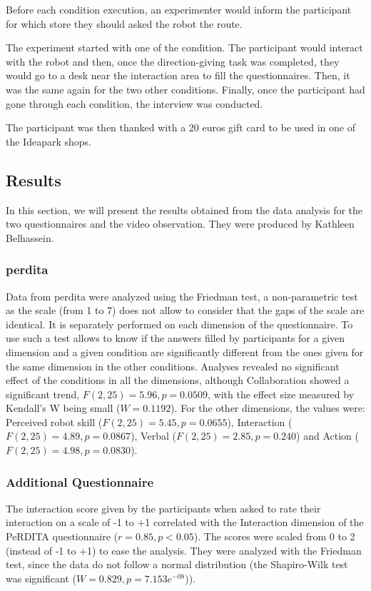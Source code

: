 \documentclass[a4paper,11pt,twoside]{StyleThese}
\begin{document}
Before each condition execution, an experimenter would inform the participant for which store they should asked the robot the route. 

The experiment started with one of the condition. The participant would interact with the robot and then, once the direction-giving task was completed, they would go to a desk near the interaction area to fill the questionnaires. Then, it was the same again for the two other conditions. Finally, once the participant had gone through each condition, the interview was conducted.

The participant was then thanked with a 20 euros gift card to be used in one of the Ideapark shops.

\subsection{Results}\label{chap8:subsec:us_results}

In this section, we will present the results obtained from the data analysis for the two questionnaires and the video observation. They were produced by Kathleen Belhassein.

\subsubsection{\acrshort{perdita}}

Data from \acrshort{perdita} were analyzed using the Friedman test, a non-parametric test as the scale (from 1 to 7) does not allow to consider that the gaps of the scale are identical. It is separately performed on each dimension of the questionnaire. To use such a test allows to know if the answers filled by participants for a given dimension and a given condition are significantly different from the ones given for the same dimension in the other conditions. Analyses revealed no significant effect of the conditions in all the dimensions, although Collaboration showed a significant trend, $F(2,25) = 5.96, p = 0.0509$, with the effect size measured by Kendall's W being small ($W=0.1192$). For the other dimensions, the values were: Perceived robot skill ($F(2,25)=5.45, p=0.0655$), Interaction ($F(2,25)=4.89, p=0.0867$), Verbal ($F(2,25)=2.85, p=0.240$) and Action ($F(2,25)=4.98, p=0.0830$).

\subsubsection{Additional Questionnaire}
The interaction score given by the participants when asked to rate their interaction on a scale of -1 to +1 correlated with the Interaction dimension of the PeRDITA questionnaire ($r = 0.85, p<0.05$). The scores were scaled from 0 to 2 (instead of -1 to +1) to ease the analysis. They were analyzed with the Friedman test, since the data do not follow a normal distribution (the Shapiro-Wilk test was significant ($W=0.829, p=7.153e^{-08}$)).
\end{document}
